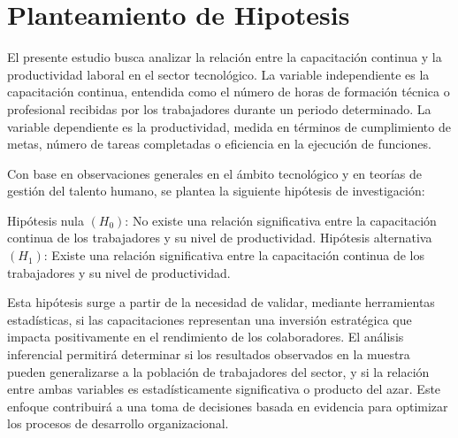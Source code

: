 \section{Planteamiento de Hipotesis}

	El presente estudio busca analizar la relación entre la capacitación continua y la productividad laboral en el sector tecnológico. La variable independiente es la capacitación continua, entendida como el número de horas de formación técnica o profesional recibidas por los trabajadores durante un periodo determinado. La variable dependiente es la productividad, medida en términos de cumplimiento de metas, número de tareas completadas o eficiencia en la ejecución de funciones.
	
	Con base en observaciones generales en el ámbito tecnológico y en teorías de gestión del talento humano, se plantea la siguiente hipótesis de investigación:
	
	Hipótesis nula $(H_0)$: No existe una relación significativa entre la capacitación continua de los trabajadores y su nivel de productividad.
	Hipótesis alternativa $(H_1)$: Existe una relación significativa entre la capacitación continua de los trabajadores y su nivel de productividad.
	
	Esta hipótesis surge a partir de la necesidad de validar, mediante herramientas estadísticas, si las capacitaciones representan una inversión estratégica que impacta positivamente en el rendimiento de los colaboradores. El análisis inferencial permitirá determinar si los resultados observados en la muestra pueden generalizarse a la población de trabajadores del sector, y si la relación entre ambas variables es estadísticamente significativa o producto del azar. Este enfoque contribuirá a una toma de decisiones basada en evidencia para optimizar los procesos de desarrollo organizacional.